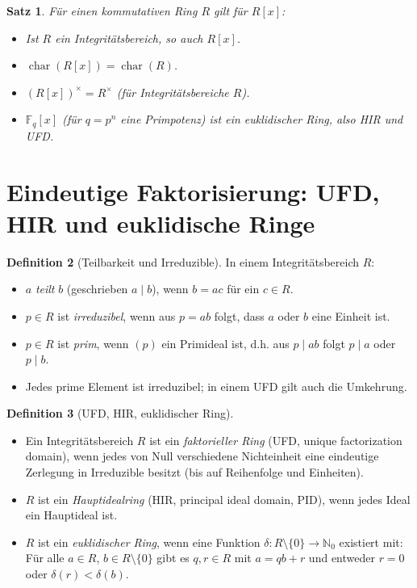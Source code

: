 \documentclass[12pt,a4paper]{amsart}
\newtheorem{theorem}{Satz}[section]
\theoremstyle{definition}
\newtheorem{definition}[theorem]{Definition}
\theoremstyle{definition}
\DeclareMathOperator{\chr}{char}
\begin{document}
\begin{theorem}
Für einen kommutativen Ring $R$ gilt für $R[x]$:
\begin{itemize}
  \item Ist $R$ ein Integritätsbereich, so auch $R[x]$.
  \item $\chr(R[x]) = \chr(R)$.
  \item $(R[x])^\times = R^\times$ (für Integritätsbereiche $R$).
  \item $\mathbb{F}_q[x]$ (für $q = p^n$ eine Primpotenz) ist ein euklidischer Ring,
        also HIR und UFD.
\end{itemize}
\end{theorem}

\section{Eindeutige Faktorisierung: UFD, HIR und euklidische Ringe}

\begin{definition}[Teilbarkeit und Irreduzible]
In einem Integritätsbereich $R$:
\begin{itemize}
  \item $a$ \emph{teilt} $b$ (geschrieben $a \mid b$), wenn $b = ac$ für ein $c \in R$.
  \item $p \in R$ ist \emph{irreduzibel}, wenn aus $p = ab$ folgt, dass $a$ oder $b$
        eine Einheit ist.
  \item $p \in R$ ist \emph{prim}, wenn $(p)$ ein Primideal ist, d.h. aus $p \mid ab$
        folgt $p \mid a$ oder $p \mid b$.
  \item Jedes prime Element ist irreduzibel; in einem UFD gilt auch die Umkehrung.
\end{itemize}
\end{definition}

\begin{definition}[UFD, HIR, euklidischer Ring]
\begin{itemize}
  \item Ein Integritätsbereich $R$ ist ein \emph{faktorieller Ring} (UFD, unique
        factorization domain), wenn jedes von Null verschiedene Nichteinheit eine
        eindeutige Zerlegung in Irreduzible besitzt (bis auf Reihenfolge und Einheiten).
  \item $R$ ist ein \emph{Hauptidealring} (HIR, principal ideal domain, PID), wenn
        jedes Ideal ein Hauptideal ist.
  \item $R$ ist ein \emph{euklidischer Ring}, wenn eine Funktion
        $\delta\colon R \setminus \{0\} \to \mathbb{N}_0$ existiert mit: Für alle
        $a \in R$, $b \in R \setminus \{0\}$ gibt es $q, r \in R$ mit $a = qb + r$
        und entweder $r = 0$ oder $\delta(r) < \delta(b)$.
\end{itemize}
\end{definition}
\end{document}
